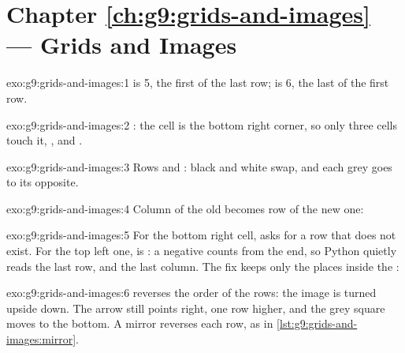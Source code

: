 \section*{Chapter \ref{ch:g9:grids-and-images} --- Grids and Images}

\begin{solution}{exo:g9:grids-and-images:1}
 is 5, the first  of the last row;  is
6, the last  of the first row.
\end{solution}

\begin{solution}{exo:g9:grids-and-images:2}
\code{[9, 4, 4]}: the cell is the bottom right corner, so only three cells touch
it, ,  and .
\end{solution}

\begin{solution}{exo:g9:grids-and-images:3}
Rows  and : black and white swap, and each grey goes to
its opposite.
\end{solution}

\begin{solution}{exo:g9:grids-and-images:4}
Column  of the old  becomes row  of the new one:

\label{lst:g9:grids-and-images:sol-transpose}
\end{solution}

\begin{solution}{exo:g9:grids-and-images:5}
For the bottom right cell,  asks for a row that does not
exist. For the top left one,  is : a negative
 counts from the end, so Python quietly reads the last row, and
 the last column. The fix keeps only the places inside the
:

\label{lst:g9:grids-and-images:sol-neighbours}
\end{solution}

\begin{solution}{exo:g9:grids-and-images:6}
 reverses the order of the rows: the image is turned upside
down. The arrow still points right, one row higher, and the grey square moves
to the bottom. A mirror reverses each row, as in
\cref{lst:g9:grids-and-images:mirror}.
\end{solution}

